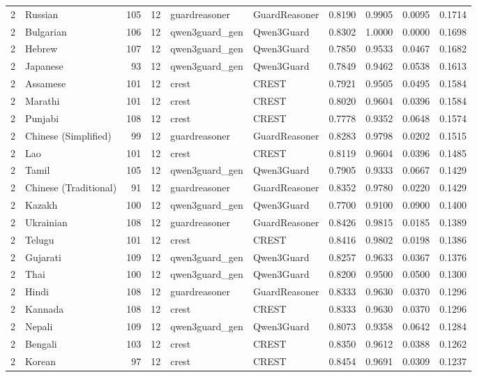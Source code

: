 \begin{tabular}{rlrrllrrrr}
2 & Russian & 105 & 12 & guardreasoner & GuardReasoner & 0.8190 & 0.9905 & 0.0095 & 0.1714 \\
2 & Bulgarian & 106 & 12 & qwen3guard\_gen & Qwen3Guard & 0.8302 & 1.0000 & 0.0000 & 0.1698 \\
2 & Hebrew & 107 & 12 & qwen3guard\_gen & Qwen3Guard & 0.7850 & 0.9533 & 0.0467 & 0.1682 \\
2 & Japanese & 93 & 12 & qwen3guard\_gen & Qwen3Guard & 0.7849 & 0.9462 & 0.0538 & 0.1613 \\
2 & Assamese & 101 & 12 & crest & CREST & 0.7921 & 0.9505 & 0.0495 & 0.1584 \\
2 & Marathi & 101 & 12 & crest & CREST & 0.8020 & 0.9604 & 0.0396 & 0.1584 \\
2 & Punjabi & 108 & 12 & crest & CREST & 0.7778 & 0.9352 & 0.0648 & 0.1574 \\
2 & Chinese (Simplified) & 99 & 12 & guardreasoner & GuardReasoner & 0.8283 & 0.9798 & 0.0202 & 0.1515 \\
2 & Lao & 101 & 12 & crest & CREST & 0.8119 & 0.9604 & 0.0396 & 0.1485 \\
2 & Tamil & 105 & 12 & qwen3guard\_gen & Qwen3Guard & 0.7905 & 0.9333 & 0.0667 & 0.1429 \\
2 & Chinese (Traditional) & 91 & 12 & guardreasoner & GuardReasoner & 0.8352 & 0.9780 & 0.0220 & 0.1429 \\
2 & Kazakh & 100 & 12 & qwen3guard\_gen & Qwen3Guard & 0.7700 & 0.9100 & 0.0900 & 0.1400 \\
2 & Ukrainian & 108 & 12 & guardreasoner & GuardReasoner & 0.8426 & 0.9815 & 0.0185 & 0.1389 \\
2 & Telugu & 101 & 12 & crest & CREST & 0.8416 & 0.9802 & 0.0198 & 0.1386 \\
2 & Gujarati & 109 & 12 & qwen3guard\_gen & Qwen3Guard & 0.8257 & 0.9633 & 0.0367 & 0.1376 \\
2 & Thai & 100 & 12 & qwen3guard\_gen & Qwen3Guard & 0.8200 & 0.9500 & 0.0500 & 0.1300 \\
2 & Hindi & 108 & 12 & guardreasoner & GuardReasoner & 0.8333 & 0.9630 & 0.0370 & 0.1296 \\
2 & Kannada & 108 & 12 & crest & CREST & 0.8333 & 0.9630 & 0.0370 & 0.1296 \\
2 & Nepali & 109 & 12 & qwen3guard\_gen & Qwen3Guard & 0.8073 & 0.9358 & 0.0642 & 0.1284 \\
2 & Bengali & 103 & 12 & crest & CREST & 0.8350 & 0.9612 & 0.0388 & 0.1262 \\
2 & Korean & 97 & 12 & crest & CREST & 0.8454 & 0.9691 & 0.0309 & 0.1237 \\

\end{tabular}
